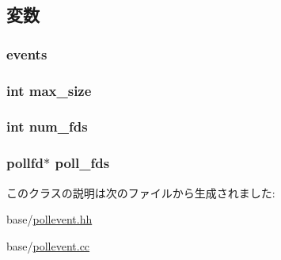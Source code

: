 \subsection{変数}
\hypertarget{classPollQueue_a0d7a0c13fa669886380eca2fe79bf0ad}{
\subsubsection[{events}]{ {\bf events}}}
\label{classPollQueue_a0d7a0c13fa669886380eca2fe79bf0ad}
\hypertarget{classPollQueue_a98ca8117bc73d9d7520727c4ce8772e6}{
\subsubsection[{max\_\-size}]{\setlength{\rightskip}{0pt plus 5cm}int {\bf max\_\-size}}}
\label{classPollQueue_a98ca8117bc73d9d7520727c4ce8772e6}
\hypertarget{classPollQueue_a87fdf770430098f0bf2a4e540804aaf2}{
\subsubsection[{num\_\-fds}]{\setlength{\rightskip}{0pt plus 5cm}int {\bf num\_\-fds}}}
\label{classPollQueue_a87fdf770430098f0bf2a4e540804aaf2}
\hypertarget{classPollQueue_aee8bf4d1604933fa62865d958c61a35c}{
\subsubsection[{poll\_\-fds}]{\setlength{\rightskip}{0pt plus 5cm}pollfd$\ast$ {\bf poll\_\-fds}}}
\label{classPollQueue_aee8bf4d1604933fa62865d958c61a35c}


このクラスの説明は次のファイルから生成されました:\begin{DoxyCompactItemize}
\item 
base/\hyperlink{pollevent_8hh}{pollevent.hh}\item 
base/\hyperlink{pollevent_8cc}{pollevent.cc}\end{DoxyCompactItemize}
